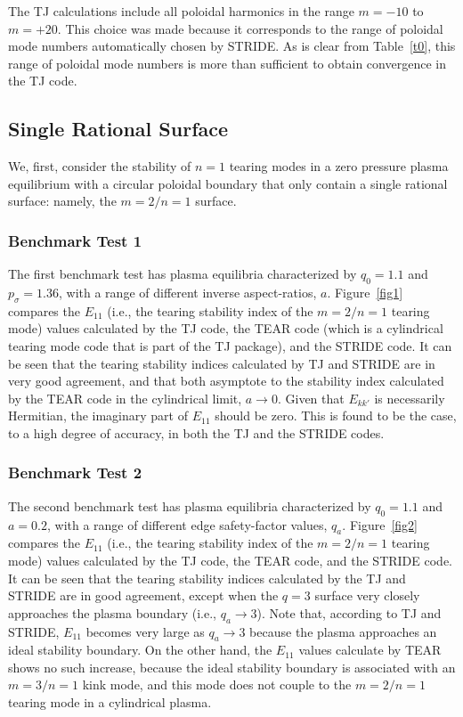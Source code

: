 \documentclass[12pt,prb,aps]{revtex4-1}
\begin{document}
The TJ calculations include all poloidal harmonics in the range $m=-10$ to $m=+20$. This choice was made because it corresponds to the range of poloidal mode numbers automatically chosen by STRIDE. As is
clear from Table~\ref{t0}, this range of poloidal mode numbers is more than sufficient to obtain convergence in the TJ code. 

\subsection{Single Rational Surface}
We, first,  consider the stability of $n=1$ tearing modes 
in a zero pressure plasma equilibrium with a circular poloidal boundary that only contain a single rational surface: namely, the $m=2/n=1$ surface. 

\subsubsection{Benchmark Test 1}
The first benchmark  test has plasma equilibria characterized by $q_0=1.1$ and $p_\sigma=1.36$, with a range of different inverse aspect-ratios, $a$. 
Figure~\ref{fig1} compares the $E_{11}$ (i.e.,
the tearing stability index of the  $m=2/n=1$ tearing mode) values calculated by the TJ code,\cite{tj} the TEAR code (which is a cylindrical tearing mode code that is part of the TJ package), and
the STRIDE code. It can be seen that the tearing stability indices calculated by  TJ and STRIDE are in very good agreement, and that both asymptote to the stability index calculated by the TEAR code
in the cylindrical limit, $a\rightarrow 0$. Given that  $E_{kk'}$ is necessarily Hermitian,\cite{tj} the imaginary part of $E_{11}$ should be zero. This is found to be the case, to a high
degree of accuracy, in both the TJ and the STRIDE codes. 

\subsubsection{Benchmark Test 2}
The second benchmark test has plasma equilibria characterized by $q_0=1.1$ and $a=0.2$, with a range of different edge safety-factor values, $q_a$. 
Figure~\ref{fig2} compares the $E_{11}$ (i.e.,
the tearing stability index of the $m=2/n=1$ tearing mode) values calculated by the TJ code, the TEAR code, and
the STRIDE code. It can be seen that the tearing stability indices calculated by the TJ and STRIDE are in good agreement, except when the $q=3$ surface very closely approaches the
plasma boundary (i.e., $q_a\rightarrow 3$). 
Note that, according to TJ and STRIDE,  $E_{11}$ becomes very large as $q_a\rightarrow 3$ because the plasma approaches an ideal stability boundary. On the other hand,
the $E_{11}$ values calculate by TEAR shows no such increase, because the ideal stability boundary is associated with an $m=3/n=1$ kink mode, and this mode does not couple to the $m=2/n=1$ tearing mode in a cylindrical plasma. 
\end{document}
